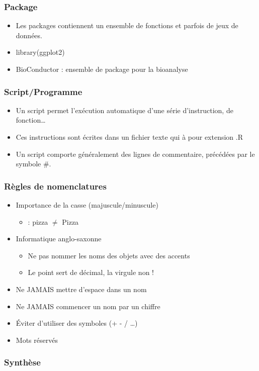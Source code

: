 \documentclass[handout, table,svgnames,hyperref={pdfpagemode=FullScreen}]{beamer}
\newcommand{\grille}{
\begin{tikzpicture}[overlay,remember picture]
	\begin{scope}[shift={(current page.south west)}]
		\draw[gray!50] (0,0) grid[step=2mm] (current page.north east);
		\draw[red!50] (0,0) grid[step=1cm] (current page.north east);
		\draw (0.2,1) node {1};
     \draw (0.2,2) node {2};
     \draw (0.2,3) node {3};
     \draw (0.2,4) node {4};
     \draw (0.2,5) node {5};
     \draw (0.2,6) node {6};
     \draw (0.2,7) node {7};
     \draw (0.2,8) node {8};
     \draw (0.2,9) node {9};
     \draw (1,0.5) node {1};
     \draw (2,0.5) node {2};
     \draw (3,0.5) node {3};
     \draw (4,0.5) node {4};
     \draw (5,0.5) node {5};
     \draw (6,0.5) node {6};
     \draw (7,0.5) node {7};
     \draw (8,0.5) node {8};
     \draw (9,0.5) node {9};
     \draw (10,0.5) node {10};
     \draw (11,0.5) node {11};
     \draw (12,0.5) node {12};
\end{scope}
\end{tikzpicture}
}
\begin{document}
	\begin{frame}
		\frametitle{Package}
		\begin{itemize}
			\item Les packages contiennent un ensemble de fonctions et parfois de jeux de données.
			\item	library(ggplot2)
			\item BioConductor : ensemble de package pour la bioanalyse
		\end{itemize}
	\end{frame}
	\begin{frame}
		\setbeamercovered{dynamic}
		\frametitle{Script/Programme}
		\begin{itemize}
			\item Un script permet l'exécution automatique d'une série d'instruction, de fonction\dots
			\item Ces instructions sont écrites dans un fichier texte qui à pour extension .R
			\item Un script comporte généralement des lignes de commentaire, précédées par le symbole \#.
		\end{itemize}

		
	\end{frame}
\begin{frame}
	\frametitle{Règles de nomenclatures}
	\begin{itemize}
		\item Importance de la casse (majuscule/minuscule)
			\begin{itemize}
				\item : pizza  $\neq$ Pizza
			\end{itemize}
		\item Informatique anglo-saxonne
			\begin{itemize}
				\item Ne pas nommer les noms des objets avec des accents 
				\item Le point sert de décimal, la virgule non !
			\end{itemize}
		\item Ne JAMAIS mettre d'espace dans un nom  
		\item Ne JAMAIS commencer un nom par un chiffre 
		\item Éviter d'utiliser des symboles (+ - / \dots)
		\item Mots réservés
	\end{itemize}
\end{frame}
\begin{frame}
	\frametitle{Synthèse}
	\begin{center}
	
\end{center}
\end{frame}
\end{document}
